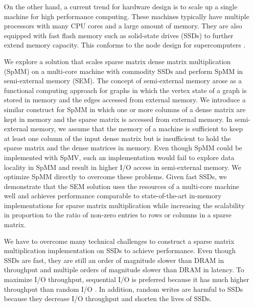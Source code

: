 
On the other hand, a current trend for hardware design is to scale up
a single machine for high performance computing.
These machines typically have multiple processors with many CPU cores and
a large amount of memory. They are also equipped with fast flash
memory such as solid-state drives (SSDs) to further extend memory capacity.
This conforms to the node design for supercomputers \cite{Ang14}.

We explore a solution that scales sparse matrix dense matrix multiplication
(SpMM) on a multi-core machine with commodity SSDs and
perform SpMM in semi-external memory (SEM). The concept of semi-external memory
arose as a functional computing approach for graphs \cite{Abello98} in which
the vertex state of a graph is stored in memory and the edges accessed from
external memory. We introduce a similar construct for SpMM in which one or more
columns of a dense matrix are kept in memory and the sparse matrix is accessed
from external memory. In semi-external memory, we assume
that the memory of a machine is sufficient to keep at least one column
of the input dense matrix but is insufficient to hold the sparse matrix
and the dense matrices in memory. Even though SpMM could be implemented with
SpMV, such an implementation would fail to explore data locality in SpMM and
result in higher I/O access in semi-external memory. We optimize SpMM directly
to overcome these problems. Given fast SSDs, we demonstrate that the SEM
solution uses the resources of a multi-core machine well and
achieves performance comparable to state-of-the-art in-memory implementations
for sparse matrix multiplication while increasing the scalability in proportion
to the ratio of non-zero entries to rows or columns in a sparse matrix.


We have to overcome many technical challenges to construct a sparse matrix
multiplication implementation on SSDs to achieve performance. Even though SSDs
are fast, they are still an order of magnitude slower than DRAM in throughput
and multiple orders of magnitude slower than DRAM in latency.
To maximize I/O throughput, sequential I/O is preferred because it has much
higher throughput than random I/O \cite{safs}. In addition, random writes are
harmful to SSDs \cite{sfs} because
they decrease I/O throughput and shorten the lives of SSDs.

